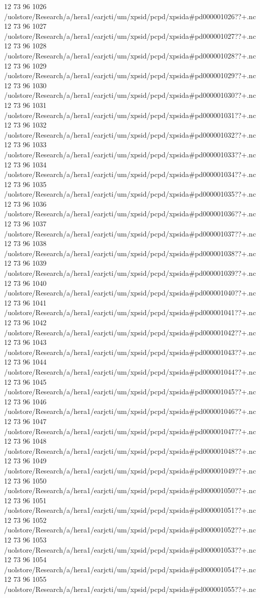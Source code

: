 12 73 96
1026
/uolstore/Research/a/hera1/earjcti/um/xpsid/pcpd/xpsida#pd000001026??+.nc
12 73 96
1027
/uolstore/Research/a/hera1/earjcti/um/xpsid/pcpd/xpsida#pd000001027??+.nc
12 73 96
1028
/uolstore/Research/a/hera1/earjcti/um/xpsid/pcpd/xpsida#pd000001028??+.nc
12 73 96
1029
/uolstore/Research/a/hera1/earjcti/um/xpsid/pcpd/xpsida#pd000001029??+.nc
12 73 96
1030
/uolstore/Research/a/hera1/earjcti/um/xpsid/pcpd/xpsida#pd000001030??+.nc
12 73 96
1031
/uolstore/Research/a/hera1/earjcti/um/xpsid/pcpd/xpsida#pd000001031??+.nc
12 73 96
1032
/uolstore/Research/a/hera1/earjcti/um/xpsid/pcpd/xpsida#pd000001032??+.nc
12 73 96
1033
/uolstore/Research/a/hera1/earjcti/um/xpsid/pcpd/xpsida#pd000001033??+.nc
12 73 96
1034
/uolstore/Research/a/hera1/earjcti/um/xpsid/pcpd/xpsida#pd000001034??+.nc
12 73 96
1035
/uolstore/Research/a/hera1/earjcti/um/xpsid/pcpd/xpsida#pd000001035??+.nc
12 73 96
1036
/uolstore/Research/a/hera1/earjcti/um/xpsid/pcpd/xpsida#pd000001036??+.nc
12 73 96
1037
/uolstore/Research/a/hera1/earjcti/um/xpsid/pcpd/xpsida#pd000001037??+.nc
12 73 96
1038
/uolstore/Research/a/hera1/earjcti/um/xpsid/pcpd/xpsida#pd000001038??+.nc
12 73 96
1039
/uolstore/Research/a/hera1/earjcti/um/xpsid/pcpd/xpsida#pd000001039??+.nc
12 73 96
1040
/uolstore/Research/a/hera1/earjcti/um/xpsid/pcpd/xpsida#pd000001040??+.nc
12 73 96
1041
/uolstore/Research/a/hera1/earjcti/um/xpsid/pcpd/xpsida#pd000001041??+.nc
12 73 96
1042
/uolstore/Research/a/hera1/earjcti/um/xpsid/pcpd/xpsida#pd000001042??+.nc
12 73 96
1043
/uolstore/Research/a/hera1/earjcti/um/xpsid/pcpd/xpsida#pd000001043??+.nc
12 73 96
1044
/uolstore/Research/a/hera1/earjcti/um/xpsid/pcpd/xpsida#pd000001044??+.nc
12 73 96
1045
/uolstore/Research/a/hera1/earjcti/um/xpsid/pcpd/xpsida#pd000001045??+.nc
12 73 96
1046
/uolstore/Research/a/hera1/earjcti/um/xpsid/pcpd/xpsida#pd000001046??+.nc
12 73 96
1047
/uolstore/Research/a/hera1/earjcti/um/xpsid/pcpd/xpsida#pd000001047??+.nc
12 73 96
1048
/uolstore/Research/a/hera1/earjcti/um/xpsid/pcpd/xpsida#pd000001048??+.nc
12 73 96
1049
/uolstore/Research/a/hera1/earjcti/um/xpsid/pcpd/xpsida#pd000001049??+.nc
12 73 96
1050
/uolstore/Research/a/hera1/earjcti/um/xpsid/pcpd/xpsida#pd000001050??+.nc
12 73 96
1051
/uolstore/Research/a/hera1/earjcti/um/xpsid/pcpd/xpsida#pd000001051??+.nc
12 73 96
1052
/uolstore/Research/a/hera1/earjcti/um/xpsid/pcpd/xpsida#pd000001052??+.nc
12 73 96
1053
/uolstore/Research/a/hera1/earjcti/um/xpsid/pcpd/xpsida#pd000001053??+.nc
12 73 96
1054
/uolstore/Research/a/hera1/earjcti/um/xpsid/pcpd/xpsida#pd000001054??+.nc
12 73 96
1055
/uolstore/Research/a/hera1/earjcti/um/xpsid/pcpd/xpsida#pd000001055??+.nc

